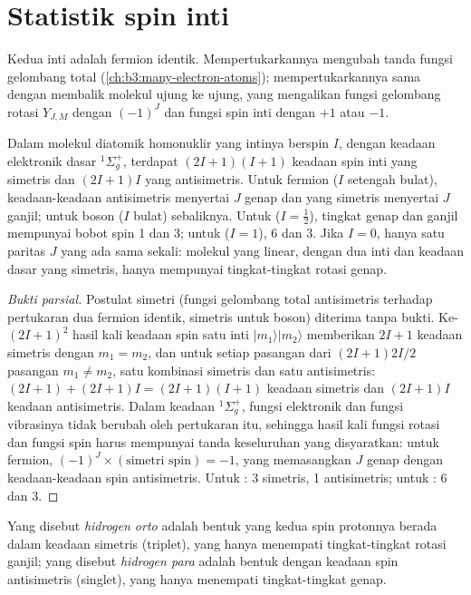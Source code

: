 \section{Statistik spin inti}

Kedua inti  adalah fermion identik. Mempertukarkannya mengubah tanda
fungsi gelombang total (\cref{ch:b3:many-electron-atoms}); mempertukarkannya
sama dengan membalik molekul ujung ke ujung, yang mengalikan fungsi gelombang
rotasi $Y_{J,M}$ dengan $(-1)^J$ dan fungsi spin inti dengan $+1$ atau $-1$.

\begin{theorem}\label{thm:b3:statistical-thermo-applied:spin-statistics}
Dalam molekul diatomik homonuklir yang intinya berspin $I$, dengan keadaan
elektronik dasar ${}^1\Sigma_g^+$, terdapat $(2I+1)(I+1)$ keadaan spin inti yang
simetris dan $(2I+1)I$ yang antisimetris. Untuk fermion ($I$ setengah bulat),
keadaan-keadaan antisimetris menyertai $J$ genap dan yang simetris menyertai
$J$ ganjil; untuk boson ($I$ bulat) sebaliknya. Untuk  ($I = \frac12$),
tingkat genap dan ganjil mempunyai bobot spin 1 dan 3; untuk  ($I = 1$),
6 dan 3. Jika $I = 0$, hanya satu paritas $J$ yang ada sama sekali: molekul
 yang linear, dengan dua inti  dan keadaan dasar yang
simetris, hanya mempunyai tingkat-tingkat rotasi genap.
\end{theorem}

\begin{proof}[Bukti parsial]
Postulat simetri (fungsi gelombang total antisimetris terhadap pertukaran dua
fermion identik, simetris untuk boson) diterima tanpa bukti. Ke-$(2I+1)^2$ hasil
kali keadaan spin satu inti $|m_1\rangle|m_2\rangle$ memberikan $2I+1$ keadaan
simetris dengan $m_1 = m_2$, dan untuk setiap pasangan dari $(2I+1)2I/2$
pasangan $m_1 \ne m_2$, satu kombinasi simetris dan satu antisimetris:
$(2I+1) + (2I+1)I = (2I+1)(I+1)$ keadaan simetris dan $(2I+1)I$ keadaan
antisimetris. Dalam keadaan ${}^1\Sigma_g^+$, fungsi elektronik dan fungsi
vibrasinya tidak berubah oleh pertukaran itu, sehingga hasil kali fungsi
rotasi dan fungsi spin harus mempunyai tanda keseluruhan yang disyaratkan:
untuk fermion, $(-1)^J \times(\text{simetri spin}) = -1$, yang memasangkan
$J$ genap dengan keadaan-keadaan spin antisimetris. Untuk : 3 simetris,
1 antisimetris; untuk : 6 dan
3.
\end{proof}

\begin{definition}\label{def:b3:statistical-thermo-applied:spin-isomers}
Yang disebut \emph{hidrogen orto} adalah bentuk 
yang kedua spin protonnya berada dalam keadaan simetris (triplet), yang hanya
menempati tingkat-tingkat rotasi ganjil; yang disebut \emph{hidrogen
para} adalah bentuk dengan keadaan spin antisimetris
(singlet), yang hanya menempati tingkat-tingkat genap.
\end{definition}

